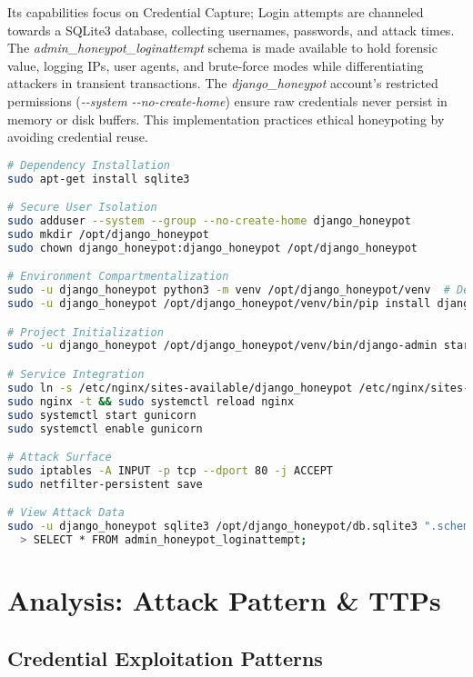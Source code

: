 \documentclass{cls/ULBreport}
\begin{document}
Its capabilities focus on Credential Capture; Login attempts are channeled towards a
SQLite3 database, collecting usernames, passwords, and attack times. The \textit{admin\_honeypot\_loginattempt} schema is made available to hold forensic
value, logging IPs, user agents, and brute-force modes while differentiating attackers in transient transactions. The \textit{django\_honeypot} account's restricted permissions (\textit{-{-}system -{-}no-create-home}) ensure raw credentials never persist in memory or disk buffers. This implementation practices ethical honeypoting by avoiding credential reuse.
    
\begin{lstlisting}[language=bash,label={lst:cowrie-context},caption={Ubuntu Setup of a Django Honeypot Webservice}]  
# Dependency Installation
sudo apt-get install sqlite3

# Secure User Isolation
sudo adduser --system --group --no-create-home django_honeypot
sudo mkdir /opt/django_honeypot
sudo chown django_honeypot:django_honeypot /opt/django_honeypot

# Environment Compartmentalization
sudo -u django_honeypot python3 -m venv /opt/django_honeypot/venv  # Dependency isolation
sudo -u django_honeypot /opt/django_honeypot/venv/bin/pip install django django-admin-honeypot gunicorn

# Project Initialization
sudo -u django_honeypot /opt/django_honeypot/venv/bin/django-admin startproject honeypot_project /opt/django_honeypot

# Service Integration
sudo ln -s /etc/nginx/sites-available/django_honeypot /etc/nginx/sites-enabled/ # Exposure
sudo nginx -t && sudo systemctl reload nginx
sudo systemctl start gunicorn
sudo systemctl enable gunicorn

# Attack Surface
sudo iptables -A INPUT -p tcp --dport 80 -j ACCEPT
sudo netfilter-persistent save

# View Attack Data
sudo -u django_honeypot sqlite3 /opt/django_honeypot/db.sqlite3 ".schema admin_honeypot_loginattempt"  # Verify capture schema
  > SELECT * FROM admin_honeypot_loginattempt;
\end{lstlisting}  


\section{Analysis: Attack Pattern \& TTPs}

\subsection{Credential Exploitation Patterns}
\end{document}
